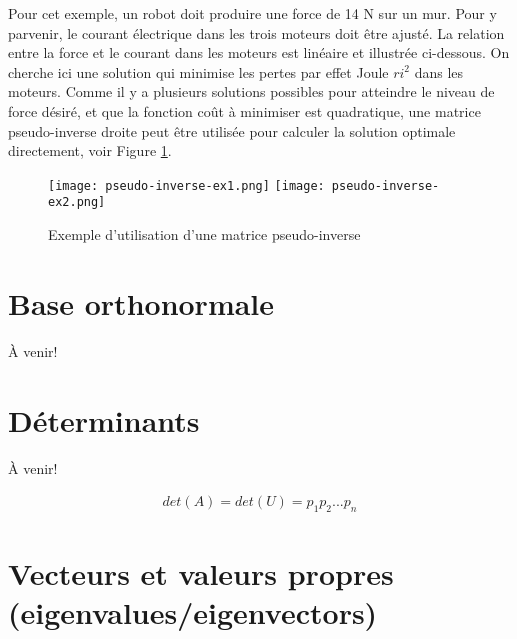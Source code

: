 Pour cet exemple, un robot doit produire une force de 14 N sur un mur. Pour y parvenir, le courant électrique dans les trois moteurs doit être ajusté. La relation entre la force et le courant dans les moteurs est linéaire et illustrée ci-dessous. On cherche ici une solution qui minimise les pertes par effet Joule $ri^2$ dans les moteurs. Comme il y a plusieurs solutions possibles pour atteindre le niveau de force désiré, et que la fonction coût à minimiser est quadratique, une matrice pseudo-inverse droite peut être utilisée pour calculer la solution optimale directement, voir Figure \ref{fig:pseudo-inverse-ex1}.
\begin{figure}[htbp]
	\centering
	\texttt{[image: pseudo-inverse-ex1.png]}
	\texttt{[image: pseudo-inverse-ex2.png]}
	\caption{Exemple d'utilisation d'une matrice pseudo-inverse}
	\label{fig:pseudo-inverse-ex1}
\end{figure}





\section{Base orthonormale}

À venir!

\section{Déterminants}

À venir!

\begin{align}
	det(A) = det(U) = p_1 p_2 ... p_n
\end{align}

\section{Vecteurs et valeurs propres (eigenvalues/eigenvectors)}

